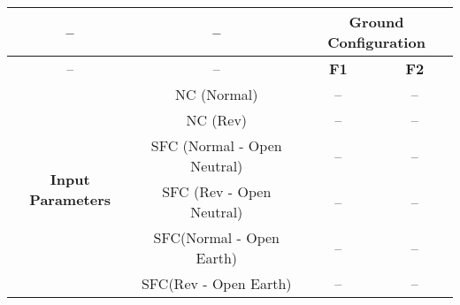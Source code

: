\begin{tabular}{|c|c|c|c|}
\hline
-- & -- & \multicolumn{2}{|c|}{\textbf{Ground Configuration}} \\
\hline
-- & -- & \textbf{F1} & \textbf{F2} \\
\hline
\multirow{6}{*}{\textbf{Input Parameters}} & NC (Normal) & -- & -- \\
 & NC (Rev) & -- & -- \\
 & SFC (Normal - Open Neutral) & -- & -- \\
 & SFC (Rev - Open Neutral) & -- & -- \\
 & SFC(Normal - Open Earth) & -- & -- \\
 & SFC(Rev - Open Earth) & -- & -- \\
\hline
\end{tabular}